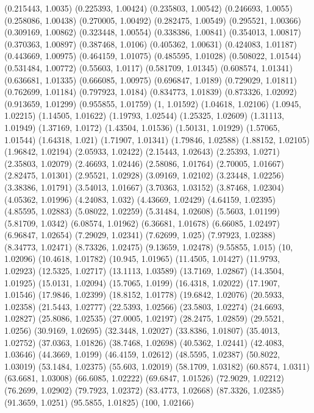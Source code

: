 {(0.215443, 1.0035)
(0.225393, 1.00424)
(0.235803, 1.00542)
(0.246693, 1.0055)
(0.258086, 1.00438)
(0.270005, 1.00492)
(0.282475, 1.00549)
(0.295521, 1.00366)
(0.309169, 1.00862)
(0.323448, 1.00554)
(0.338386, 1.00841)
(0.354013, 1.00817)
(0.370363, 1.00897)
(0.387468, 1.0106)
(0.405362, 1.00631)
(0.424083, 1.01187)
(0.443669, 1.00975)
(0.464159, 1.01075)
(0.485595, 1.01028)
(0.508022, 1.01544)
(0.531484, 1.00772)
(0.55603, 1.0117)
(0.581709, 1.01345)
(0.608574, 1.01341)
(0.636681, 1.01335)
(0.666085, 1.00975)
(0.696847, 1.0189)
(0.729029, 1.01811)
(0.762699, 1.01184)
(0.797923, 1.0184)
(0.834773, 1.01839)
(0.873326, 1.02092)
(0.913659, 1.01299)
(0.955855, 1.01759)
(1, 1.01592)
(1.04618, 1.02106)
(1.0945, 1.02215)
(1.14505, 1.01622)
(1.19793, 1.02544)
(1.25325, 1.02609)
(1.31113, 1.01949)
(1.37169, 1.0172)
(1.43504, 1.01536)
(1.50131, 1.01929)
(1.57065, 1.01544)
(1.64318, 1.021)
(1.71907, 1.01341)
(1.79846, 1.02588)
(1.88152, 1.02105)
(1.96842, 1.02194)
(2.05933, 1.02422)
(2.15443, 1.02643)
(2.25393, 1.0271)
(2.35803, 1.02079)
(2.46693, 1.02446)
(2.58086, 1.01764)
(2.70005, 1.01667)
(2.82475, 1.01301)
(2.95521, 1.02928)
(3.09169, 1.02102)
(3.23448, 1.02256)
(3.38386, 1.01791)
(3.54013, 1.01667)
(3.70363, 1.03152)
(3.87468, 1.02304)
(4.05362, 1.01996)
(4.24083, 1.032)
(4.43669, 1.02429)
(4.64159, 1.02395)
(4.85595, 1.02883)
(5.08022, 1.02259)
(5.31484, 1.02608)
(5.5603, 1.01199)
(5.81709, 1.0342)
(6.08574, 1.01962)
(6.36681, 1.01678)
(6.66085, 1.02497)
(6.96847, 1.02654)
(7.29029, 1.02341)
(7.62699, 1.025)
(7.97923, 1.02388)
(8.34773, 1.02471)
(8.73326, 1.02475)
(9.13659, 1.02478)
(9.55855, 1.015)
(10, 1.02096)
(10.4618, 1.01782)
(10.945, 1.01965)
(11.4505, 1.01427)
(11.9793, 1.02923)
(12.5325, 1.02717)
(13.1113, 1.03589)
(13.7169, 1.02867)
(14.3504, 1.01925)
(15.0131, 1.02094)
(15.7065, 1.0199)
(16.4318, 1.02022)
(17.1907, 1.01546)
(17.9846, 1.02399)
(18.8152, 1.01778)
(19.6842, 1.02076)
(20.5933, 1.02358)
(21.5443, 1.02777)
(22.5393, 1.02566)
(23.5803, 1.02274)
(24.6693, 1.02827)
(25.8086, 1.02535)
(27.0005, 1.02197)
(28.2475, 1.02859)
(29.5521, 1.0256)
(30.9169, 1.02695)
(32.3448, 1.02027)
(33.8386, 1.01807)
(35.4013, 1.02752)
(37.0363, 1.01826)
(38.7468, 1.02698)
(40.5362, 1.02441)
(42.4083, 1.03646)
(44.3669, 1.0199)
(46.4159, 1.02612)
(48.5595, 1.02387)
(50.8022, 1.03019)
(53.1484, 1.02375)
(55.603, 1.02019)
(58.1709, 1.03182)
(60.8574, 1.0311)
(63.6681, 1.03008)
(66.6085, 1.02222)
(69.6847, 1.01526)
(72.9029, 1.02212)
(76.2699, 1.02902)
(79.7923, 1.02372)
(83.4773, 1.02668)
(87.3326, 1.02385)
(91.3659, 1.0251)
(95.5855, 1.01825)
(100, 1.02166)
}

